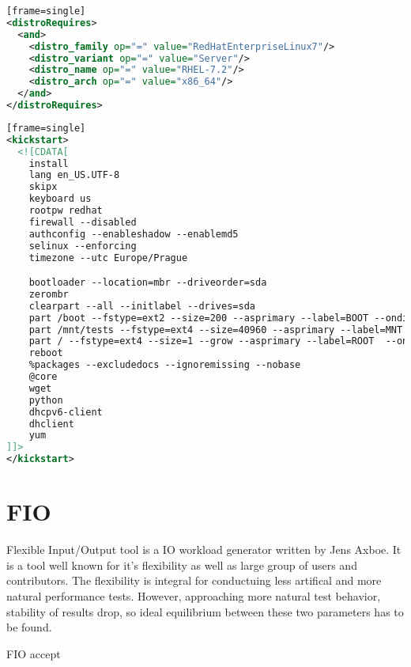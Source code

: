 \documentclass[
  color, %
  table, %
  lof,   %
  lot,   %
]{fithesis3}
\begin{document}


\begin{lstlisting}[language=xml, caption={Specifying OS to be installed}][frame=single]
<distroRequires>
  <and>
    <distro_family op="=" value="RedHatEnterpriseLinux7"/>
    <distro_variant op="=" value="Server"/>
    <distro_name op="=" value="RHEL-7.2"/>
    <distro_arch op="=" value="x86_64"/>
  </and>
</distroRequires>
\end{lstlisting}

\begin{lstlisting}[language=xml, caption={Configuring environment using kickstart}][frame=single]
<kickstart>
  <![CDATA[
    install
    lang en_US.UTF-8
    skipx
    keyboard us
    rootpw redhat
    firewall --disabled
    authconfig --enableshadow --enablemd5
    selinux --enforcing
    timezone --utc Europe/Prague

    bootloader --location=mbr --driveorder=sda
    zerombr
    clearpart --all --initlabel --drives=sda
    part /boot --fstype=ext2 --size=200 --asprimary --label=BOOT --ondisk=sda
    part /mnt/tests --fstype=ext4 --size=40960 --asprimary --label=MNT --ondisk=sda
    part / --fstype=ext4 --size=1 --grow --asprimary --label=ROOT  --ondisk=sda
    reboot
    %packages --excludedocs --ignoremissing --nobase
    @core
    wget
    python
    dhcpv6-client
    dhclient
    yum
]]>
</kickstart>
\end{lstlisting}




\section{FIO}
Flexible Input/Output tool is a IO workload generator written by Jens Axboe. It is a tool well known for it's flexibility as well as large group of users and contributors. The flexibility is integral for conductuing less artifical and more natural performance tests. However, approaching more natural test behavior, stability of results drop, so ideal equilibrium between these two parameters has to be found.

FIO accept


 
\end{document}

